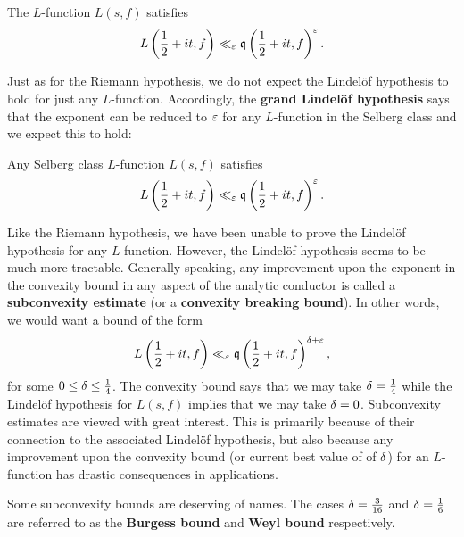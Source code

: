     \begin{conjecture*}
      The $L$-function $L(s,f)$ satisfies
      \[
        L\left(\frac{1}{2}+it,f\right) \ll_{\varepsilon} \mathfrak{q}\left(\frac{1}{2}+it,f\right)^{\varepsilon}.
      \]
    \end{conjecture*}

    Just as for the Riemann hypothesis, we do not expect the Lindel\"of hypothesis to hold for just any $L$-function. Accordingly, the \textbf{grand Lindel\"of hypothesis} says that the exponent can be reduced to $\varepsilon$ for any $L$-function in the Selberg class and we expect this to hold:

    \begin{conjecture*}
      Any Selberg class $L$-function $L(s,f)$ satisfies
      \[
        L\left(\frac{1}{2}+it,f\right) \ll_{\varepsilon} \mathfrak{q}\left(\frac{1}{2}+it,f\right)^{\varepsilon}.
      \]
    \end{conjecture*}

    Like the Riemann hypothesis, we have been unable to prove the Lindel\"of hypothesis for any $L$-function. However, the Lindel\"of hypothesis seems to be much more tractable. Generally speaking, any improvement upon the exponent in the convexity bound in any aspect of the analytic conductor is called a \textbf{subconvexity estimate} (or a \textbf{convexity breaking bound}). In other words, we would want a bound of the form
    \[
      L\left(\frac{1}{2}+it,f\right) \ll_{\varepsilon} \mathfrak{q}\left(\frac{1}{2}+it,f\right)^{\delta+\varepsilon},
    \]
    for some $0 \le \delta \le \frac{1}{4}$. The convexity bound says that we may take $\delta = \frac{1}{4}$ while the Lindel\"of hypothesis for $L(s,f)$ implies that we may take $\delta = 0$. Subconvexity estimates are viewed with great interest. This is primarily because of their connection to the associated Lindel\"of hypothesis, but also because any improvement upon the convexity bound (or current best value of of $\delta$) for an $L$-function has drastic consequences in applications.

    \begin{remark}
      Some subconvexity bounds are deserving of names. The cases $\delta = \frac{3}{16}$ and $\delta = \frac{1}{6}$ are referred to as the \textbf{Burgess bound} and \textbf{Weyl bound} respectively.
    \end{remark}
    
